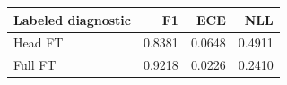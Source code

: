 \begin{tabular}{lrrr}
\toprule
Labeled diagnostic & F1 & ECE & NLL \\
\midrule
Head FT & 0.8381 & 0.0648 & 0.4911 \\
Full FT & 0.9218 & 0.0226 & 0.2410 \\
\bottomrule\end{tabular}
